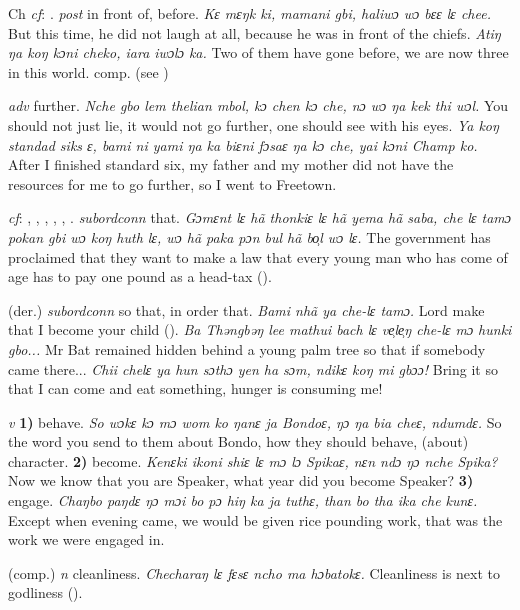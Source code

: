 \begin{letter}{Ch}
 \textit{cf}: . \textit{post} in front of, before. \textit{Kɛ mɛŋk ki, mamani gbi, haliwɔ wɔ bɛɛ lɛ chee.} But this time, he did not laugh at all, because he was in front of the chiefs. \textit{Atiŋ ŋa koŋ kɔni cheko, iara iwɔlɔ ka.} Two of them have gone before, we are now three in this world. comp.  (see ) 

 \textit{adv} further. \textit{Nche gbo lem thelian mbol, kɔ chen kɔ che, nɔ wɔ ŋa kek thi wɔl.} You should not just lie, it would not go further, one should see with his eyes. \textit{Ya koŋ standad siks ɛ, bami ni yami ŋa ka biɛni fɔsaɛ ŋa kɔ che, yai kɔni Champ ko.} After I finished standard six, my father and my mother did not have the resources for me to go further, so I went to Freetown.

 \textit{cf}: , , , , , . \textit{subordconn} that. \textit{Gɔmɛnt lɛ hã thonkiɛ lɛ hã yema hã saba, che lɛ tamɔ pokan gbi wɔ koŋ huth lɛ, wɔ hã paka pɔn bul hã bo̹l wɔ lɛ.} The government has proclaimed that they want to make a law that every young man who has come of age has to pay one pound as a head-tax (\citealt{Pichl1967}). 

 (der.) \textit{subordconn} so that, in order that. \textit{Bami nhã ya che-lɛ tamɔ.} Lord make that I become your child (\citealt{Pichl1967}). \textit{Ba Thəngbəŋ lee mathui bach lɛ ve̹le̹ŋ che-lɛ mɔ hunki gbo...} Mr Bat remained hidden behind a young palm tree so that if somebody came there... \textit{Chii chelɛ ya hun sɔthɔ yen ha sɔm, ndikɛ koŋ mi gbɔɔ!} Bring it so that I can come and eat something, hunger is consuming me!

 \textit{v} \textbf{1)} behave. \textit{So wɔkɛ kɔ mɔ wom ko ŋanɛ ja Bondoɛ, ŋɔ ŋa bia cheɛ, ndumdɛ.} So the word you send to them about Bondo, how they should behave, (about) character. \textbf{2)} become. \textit{Kenɛki ikoni shiɛ lɛ mɔ lɔ Spikaɛ, nɛn ndɔ ŋɔ nche Spika?} Now we know that you are Speaker, what year did you become Speaker? \textbf{3)} engage. \textit{Chaŋbo paŋdɛ ŋɔ mɔi bo pɔ hiŋ ka ja tuthɛ, than bo tha ika che kunɛ.} Except when evening came, we would be given rice pounding work, that was the work we were engaged in.

 (comp.) \textit{n} cleanliness. \textit{Checharaŋ lɛ fɛsɛ ncho ma hɔbatokɛ.} Cleanliness is next to godliness (\citealt{Pichl1967}). 


\end{letter}
